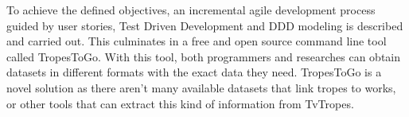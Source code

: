 \begin{otherlanguage}{english}
To achieve the defined objectives, an incremental agile development process
guided by user stories, Test Driven Development and DDD modeling is described
and carried out. This culminates in a free and open source command line tool
called TropesToGo. With this tool, both programmers and researches can obtain
datasets in different formats with the exact data they need. TropesToGo is a
novel solution as there aren't many available datasets that link tropes to
works, or other tools that can extract this kind of information from TvTropes.

\end{otherlanguage}
